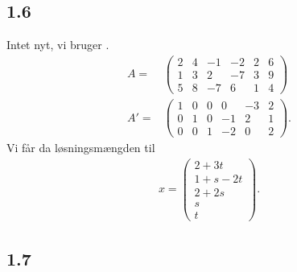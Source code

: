 		\subsection{1.6}

			Intet nyt, vi bruger \cite[Sætning 1.2.18]{hesselholt2017}.
			\begin{align*}
				A=&\left(\begin{array}{rrrrr|r} {2} & {4} & {-1} & {-2} & {2} & {6} \\ {1} & {3} & {2} & {-7} & {3} & {9} \\ {5} & {8} & {-7} & {6} & {1} & {4} \end{array}\right)\\
				A'=&\left(\begin {array}{rrrrr|r} 1&0&0&0&-3&2\\ 0&1&0&
					-1&2&1\\ 0&0&1&-2&0&2\end {array} \right).
			\end{align*} 
		Vi får da løsningsmængden til
			\begin{align*}
				x =\left(\begin{array}{c} 2+3t \\ 1+s-2t \\ 2+2s \\ s \\ t \end{array}\right).
			\end{align*}

		\subsection{1.7}

